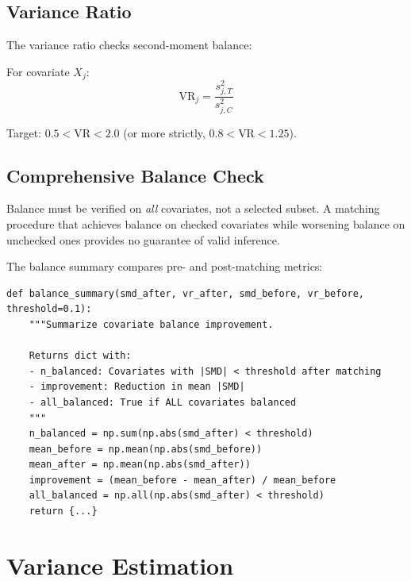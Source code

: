\subsection{Variance Ratio}

The variance ratio checks second-moment balance:

\begin{definition}
\label{def:variance_ratio}
For covariate $X_j$:
\begin{equation}
\text{VR}_j = \frac{s_{j,T}^2}{s_{j,C}^2}
\label{eq:vr}
\end{equation}
\end{definition}

Target: $0.5 < \text{VR} < 2.0$ (or more strictly, $0.8 < \text{VR} < 1.25$).

\subsection{Comprehensive Balance Check}

\begin{remark}
Balance must be verified on \emph{all} covariates, not a selected subset. A matching procedure that achieves balance on checked covariates while worsening balance on unchecked ones provides no guarantee of valid inference.
\end{remark}

The balance summary compares pre- and post-matching metrics:

\begin{verbatim}
def balance_summary(smd_after, vr_after, smd_before, vr_before, threshold=0.1):
    """Summarize covariate balance improvement.

    Returns dict with:
    - n_balanced: Covariates with |SMD| < threshold after matching
    - improvement: Reduction in mean |SMD|
    - all_balanced: True if ALL covariates balanced
    """
    n_balanced = np.sum(np.abs(smd_after) < threshold)
    mean_before = np.mean(np.abs(smd_before))
    mean_after = np.mean(np.abs(smd_after))
    improvement = (mean_before - mean_after) / mean_before
    all_balanced = np.all(np.abs(smd_after) < threshold)
    return {...}
\end{verbatim}


\section{Variance Estimation}
\label{sec:psm_variance}

